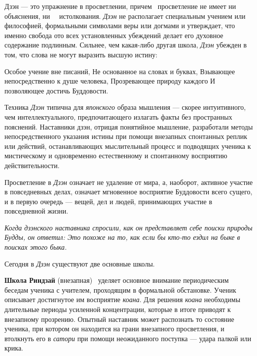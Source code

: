 \documentclass[a4paper]{article}
\begin{document}
{
Дзэн — это упражнение в просветлении, причем \ просветление не имеет ни объяснения, ни \ \ истолкования. \textit{Дзэн}
не располагает специальным учением или философией, формальными символами веры или догмами и утверждает, что именно
свобода ото всех установленных убеждений делает его духовное содержание подлинным. Сильнее, чем какая-либо другая
школа, \textit{Дзэн} убежден в том, что слова не могут выразить высшую истину:}

{
{\textquotedbl}Особое учение вне писаний, \newline
Не основанное на словах и буквах, \newline
Взывающее непосредственно к душе человека, \newline
Прозревающее природу каждого \newline
И позволяющее достичь Буддовости.{\textquotedbl}}

{
Техника \textit{Дзэн} типична для \textit{японского} образа мышления — скорее интуитивного, чем интеллектуального,
предпочитающего излагать факты без пространных пояснений. Наставники дзэн, отрицая понятийное мышление, разработали
методы непосредственного указания истины при помощи внезапных спонтанных реплик или действий, останавливающих
мыслительный процесс и подводящих ученика к мистическому и одновременно естественному и спонтанному восприятию
действительности. }

{
Просветление в \textit{Дзэн} означает не удаление от мира, а, наоборот, активное участие в повседневных делах, означает
мгновенное восприятие Буддовости всего сущего, и в первую очередь — вещей, дел и людей, принимающих участие в
повседневной жизни. \ }

{\itshape
Когда дзэнского наставника спросили, как он представляет себе поиски природы Будды, он ответил: {\textquotedbl}Это
похоже на то, как если бы кто-то ездил на быке в поисках этого быка{\textquotedbl}.}

{
Сегодня в \textit{Дзэн} существуют две основные школы. }

{
\textbf{Школа Риндзай} (внезапная) \ уделяет основное внимание периодическим беседам ученика с учителем, проходящим в
формальной обстановке. Ученик описывает достигнутое им восприятие \textit{коана}. Для решения \textit{коана} необходимы
длительные периоды усиленной концентрации, которые в итоге приводят к внезапному прозрению. Опытный наставник может
распознать то состояние ученика, при котором он находится на грани внезапного просветления, и
{\textquotedbl}втолкнуть{\textquotedbl} его в \textit{сатори} при помощи неожиданного поступка — удара палкой или
крика. }
\end{document}
